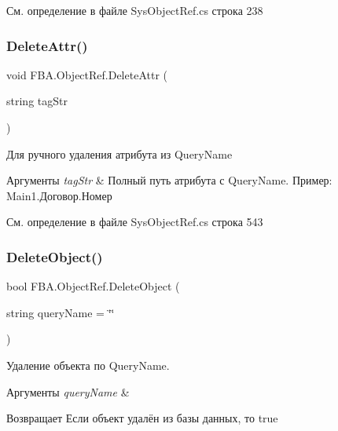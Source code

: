 См. определение в файле Sys\+Object\+Ref.\+cs строка 238

\mbox{\label{class_f_b_a_1_1_object_ref_accd3d673b6732103abd0e1677b4728cd}} 
\subsubsection{\texorpdfstring{Delete\+Attr()}{DeleteAttr()}}
{\footnotesize\ttfamily void F\+B\+A.\+Object\+Ref.\+Delete\+Attr (\begin{DoxyParamCaption}\item[{string}]{tag\+Str }\end{DoxyParamCaption})}



Для ручного удаления атрибута из Query\+Name 


\begin{DoxyParams}{Аргументы}
{\em tag\+Str} & Полный путь атрибута с Query\+Name. Пример\+: Main1.\+Договор.\+Номер\\
\hline
\end{DoxyParams}


См. определение в файле Sys\+Object\+Ref.\+cs строка 543

\mbox{\label{class_f_b_a_1_1_object_ref_a43b293335c3d6c55581b02e4e525c2ae}} 
\subsubsection{\texorpdfstring{Delete\+Object()}{DeleteObject()}\hspace{0.1cm}{\footnotesize\ttfamily [1/3]}}
{\footnotesize\ttfamily bool F\+B\+A.\+Object\+Ref.\+Delete\+Object (\begin{DoxyParamCaption}\item[{string}]{query\+Name = {\ttfamily \char`\"{}\char`\"{}} }\end{DoxyParamCaption})}



Удаление объекта по Query\+Name. 


\begin{DoxyParams}{Аргументы}
{\em query\+Name} & \\
\hline
\end{DoxyParams}
\begin{DoxyReturn}{Возвращает}
Если объект удалён из базы данных, то true
\end{DoxyReturn}


